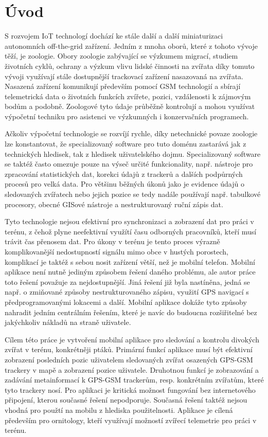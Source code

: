 \chapter*{Úvod}

S rozvojem IoT technologí dochází ke stále další a další miniaturizaci autonomních off-the-grid zařízení. Jedním z mnoha oborů, které z tohoto vývoje těží, je zoologie. Obory zoologie zabývající se výzkumem migrací, studiem životních cyklů, ochrany a výzkum vlivu lidské činnosti na zvířata díky tomuto vývoji využívají stále dostupnější trackovací zařízení nasazovaná na zvířata. Nasazená zařízení komunikují především pomocí GSM technologií a sbírají telemetrická data o životních funkcích zvířete, pozici, vzdálenosti k zájmovým bodům a podobně. Zoologové tyto údaje průběžně kontrolují a mohou využívat výpočetní techniku pro asistenci ve výzkumných i konzervačních programech.

Ačkoliv výpočetní technologie se rozvíjí rychle, díky netechnické povaze zoologie lze konstantovat, že specializovaný software pro tuto doménu zastarává jak z technických hledisek, tak z hledisek uživatelského dojmu. Specializovaný software se taktéž často omezuje pouze na výseč určité funkcionality, např. nástroje pro zpracování statistických dat, korekci údajů z trackerů a dalších podpůrných procesů pro velká data. Pro většinu běžných úkonů jako je evidence údajů o sledovaných zvířatech nebo jejich pozice se tedy nadále používají např. tabulkové procesory, obecné GISové nástroje a nestrukturovaný ruční zápis dat.

Tyto technologie nejsou efektivní pro synchronizaci a zobrazení dat pro práci v terénu, z čehož plyne neefektivní využítí času odborných pracovníků, kteří musí trávit čas přenosem dat. Pro úkony v terénu je tento proces výrazně komplikovanější nedostupností signálu mimo obce v hustých porostech, komplikací je taktéž s sebou nosit zařízení větší, než je mobilní telefon. Mobilní aplikace není nutně jediným způsobem řešení daného problému, ale autor práce toto řešení považuje za nejdostupnější. Jiná řešení již byla nastíněna, jedná se např. o zmiňované způsoby nestrukturovaného zápisu, využití GPS navigací s předprogramovanými lokacemi a další. Mobilní aplikace dokáže tyto způsoby nahradit jedním centrálním řešením, které je navíc do budoucna rozšiřitelné bez jakýchkoliv nákladů na straně uživatele. 

Cílem této práce je vytvoření mobilní aplikace pro sledování a kontrolu divokých zvířat v terénu, konkrétněji ptáků. Primární funkcí aplikace musí být efektivní zobrazení posledních pozic uživatelem sledovaných zvířat osazených GPS-GSM trackery v mapě a zobrazení pozice uživatele. Druhotnou funkcí je zobrazování a zadávání metainformací k GPS-GSM trackerům, resp. konkrétním zvířatům, které tyto trackery nosí. Pro aplikaci je kritická možnost fungování bez internetového připojení, kterou současné řešení nepodporuje. Současná řešení taktéž nejsou vhodná pro použtí na mobilu z hlediska použitelnosti. Aplikace je cílená především pro ornitology, kteří využívají možností zvířecí telemetrie pro práci v terénu.

